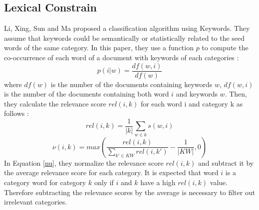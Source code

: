 \subsection{\label{seq:BackLexicalConstraint}Lexical Constrain}
Li, Xing, Sun and Ma \cite{Li:2016:EDL:2983323.2983721} proposed a
classification algorithm using Keywords. They assume that keywords could be 
semantically or statistically related to the seed words of the same category.
In this paper, they
use a function $p$ to compute the co-occurrence of each word of a document
with keywords of each categories : 
\begin{equation}\label{sim}
p(i|w) = \frac{df(w,i)}{df(w)}
\end{equation}
where $df(w)$ is the number of the documents containing keywords $w$,
$df(w, i)$ is the number of the documents containing both word
$i$ and keywords $w$.
Then, they calculate the relevance score $rel(i, k)$ for each 
word i and category k as follows :
\begin{equation}\label{rel}
  rel(i,k) = \frac{1}{|k|} \sum\limits_{w \in k} s(w,i)
\end{equation}
\begin{equation}\label{nu}
  \nu(i,k) = max \left(\frac{rel(i,k)}{\sum\limits_{k' \in KW}rel(i,k')} - \frac{1}{|KW|}, 0\right)
\end{equation}
In Equation \ref{nu}, they normalize the relevance score $rel(i,k)$ and 
subtract it by the average relevance score for each category. It is
expected that word $i$ is a category word for category $k$ only if $i$ and
$k$ have a high $rel(i,k)$ value. Therefore subtracting the relevance
scores by the average is necessary to filter out irrelevant categories.
